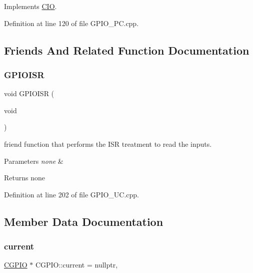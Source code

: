 Implements \mbox{\hyperlink{class_c_i_o}{C\+IO}}.



Definition at line 120 of file G\+P\+I\+O\+\_\+\+P\+C.\+cpp.



\subsection{Friends And Related Function Documentation}
\mbox{\label{class_c_g_p_i_o_a94ed9692de8f805af0517790cb06b71c}} 
\subsubsection{\texorpdfstring{G\+P\+I\+O\+I\+SR}{GPIOISR}}
{\footnotesize\ttfamily void G\+P\+I\+O\+I\+SR (\begin{DoxyParamCaption}\item[{void}]{ }\end{DoxyParamCaption})\hspace{0.3cm}{\ttfamily [friend]}}



friend function that performs the I\+SR treatment to read the inputs. 


\begin{DoxyParams}{Parameters}
{\em none} & \\
\hline
\end{DoxyParams}
\begin{DoxyReturn}{Returns}
none 
\end{DoxyReturn}


Definition at line 202 of file G\+P\+I\+O\+\_\+\+U\+C.\+cpp.



\subsection{Member Data Documentation}
\mbox{\label{class_c_g_p_i_o_a21d3b21fbb921eca646b24582fb5c43f}} 
\subsubsection{\texorpdfstring{current}{current}}
{\footnotesize\ttfamily \mbox{\hyperlink{class_c_g_p_i_o}{C\+G\+P\+IO}} $\ast$ C\+G\+P\+I\+O\+::current = nullptr\hspace{0.3cm}{\ttfamily [static]}, {\ttfamily [protected]}}

